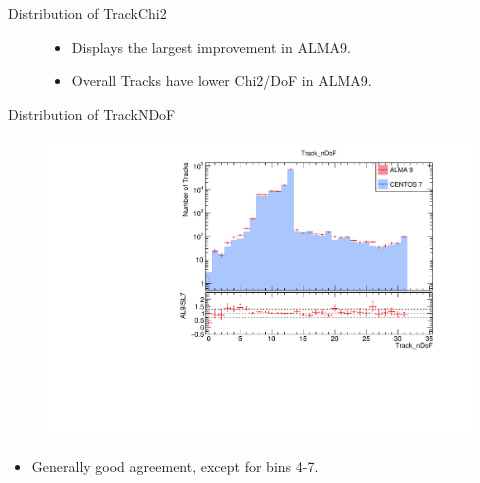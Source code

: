 \begin{frame}{Distribution of TrackChi2}
\begin{figure}
\begin{subfigure}{0.49\linewidth}
        \end{subfigure}
        \begin{itemize}
            \item Displays the largest improvement in ALMA9.
            \item Overall Tracks have lower Chi2/DoF in ALMA9.
        \end{itemize}
    \end{figure}
\end{frame}



\begin{frame}{Distribution of TrackNDoF}
    \vspace{-0.3cm}
    \begin{figure}
        \includegraphics[width=\linewidth]{./output/Track_nDoF.pdf}
    \end{figure}
    \vspace{-0.65cm}
    \begin{itemize}
        \item Generally good agreement, except for bins 4-7.
    \end{itemize}
\end{frame}

